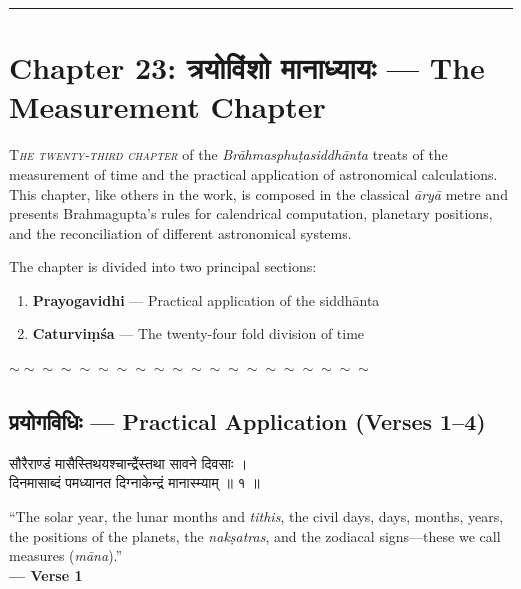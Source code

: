 \documentclass[11pt,a4paper]{article}
\newcommand{\dev}[1]{{\devanagarifont #1}}
\newenvironment{bilingualverse}{%
  \begin{paracol}{2}
  \fontsize{10.5}{13}\selectfont
}{%
  \end{paracol}
  \vspace{0.3cm}
}
\newcommand{\divider}{\begin{center}\textcolor{dividercolor}{\rule{0.5\textwidth}{0.5pt}}\end{center}}
\newcommand{\wavydivider}{\begin{center}$\sim\sim\sim\sim\sim\sim\sim\sim\sim\sim\sim\sim\sim\sim\sim\sim\sim\sim\sim\sim$\end{center}}
\newenvironment{paracol}[1]{\begingroup}{\endgroup}
\newenvironment{leftcolumn*}{\begingroup}{\endgroup}
\newenvironment{rightcolumn}{\begingroup}{\endgroup}
\begin{document}
\divider
\newpage

\section*{Chapter 23: \dev{त्रयोविंशो मानाध्यायः} — The Measurement Chapter}

\lettrine[lines=3,loversize=0.1]{T}{\textit{he twenty-third chapter}} of the \textit{Brāhmasphuṭasiddhānta} treats of the measurement of time and the practical application of astronomical calculations. This chapter, like others in the work, is composed in the classical \textit{āryā} metre and presents Brahmagupta's rules for calendrical computation, planetary positions, and the reconciliation of different astronomical systems.

The chapter is divided into two principal sections:
\begin{enumerate}[label=(\roman*),leftmargin=2em]
  \item \textbf{Prayogavidhi} — Practical application of the siddhānta
  \item \textbf{Caturviṃśa} — The twenty-four fold division of time
\end{enumerate}

\wavydivider

\subsection*{\dev{प्रयोगविधिः} — Practical Application (Verses 1--4)}

\begin{bilingualverse}
\begin{leftcolumn*}
\dev{सौरैराण्डं मासैस्तिथयश्चान्द्रैंस्तथा सावने दिवसाः ।}\\
\dev{दिनमासाब्दं पमध्यानत दिग्नाकेन्द्रं मानास्म्याम् ॥ १ ॥}
\end{leftcolumn*}
\begin{rightcolumn}
``The solar year, the lunar months and \textit{tithis}, the civil days, days, months, years, the positions of the planets, the \textit{nakṣatras}, and the zodiacal signs---these we call measures (\textit{māna}).''\\[0.3cm]
\hfill\textbf{— Verse 1}
\end{rightcolumn}
\end{bilingualverse}
\end{document}
